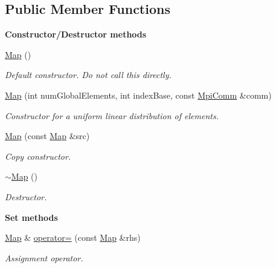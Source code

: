 \subsection*{Public Member Functions}
\begin{Indent}{\bf Constructor/\-Destructor methods}\par
\begin{DoxyCompactItemize}
\item 
\hyperlink{class_q_u_e_s_o_1_1_map_acce20c97c69af851cbf67386beb133b2}{Map} ()
\begin{DoxyCompactList}\small\item\em Default constructor. Do not call this directly. \end{DoxyCompactList}\item 
\hyperlink{class_q_u_e_s_o_1_1_map_aa5d31038467331b850a36361a60f7394}{Map} (int num\-Global\-Elements, int index\-Base, const \hyperlink{class_q_u_e_s_o_1_1_mpi_comm}{Mpi\-Comm} \&comm)
\begin{DoxyCompactList}\small\item\em Constructor for a uniform linear distribution of elements. \end{DoxyCompactList}\item 
\hyperlink{class_q_u_e_s_o_1_1_map_a381dabf55f318037416da6ae81a5db0b}{Map} (const \hyperlink{class_q_u_e_s_o_1_1_map}{Map} \&src)
\begin{DoxyCompactList}\small\item\em Copy constructor. \end{DoxyCompactList}\item 
\hyperlink{class_q_u_e_s_o_1_1_map_a280330a2d8fc1694461f09941a443b4e}{$\sim$\-Map} ()
\begin{DoxyCompactList}\small\item\em Destructor. \end{DoxyCompactList}\end{DoxyCompactItemize}
\end{Indent}
\begin{Indent}{\bf Set methods}\par
\begin{DoxyCompactItemize}
\item 
\hyperlink{class_q_u_e_s_o_1_1_map}{Map} \& \hyperlink{class_q_u_e_s_o_1_1_map_afb3d6d9dc20139964090478678194359}{operator=} (const \hyperlink{class_q_u_e_s_o_1_1_map}{Map} \&rhs)
\begin{DoxyCompactList}\small\item\em Assignment operator. \end{DoxyCompactList}\end{DoxyCompactItemize}
\end{Indent}
